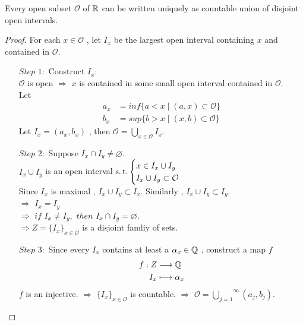 	\vspace*{2em}
	\begin{thm}\label{thm 1.1.3}
		Every open subset $\mathcal{O}$ of $\mathbb{R}$ can be written uniquely as countable union of disjoint open intervals.
		
		\begin{proof}
			For each $x \in \mathcal{O}$ , let $I_x$ be the largest open interval containing $x$ and contained in $\mathcal{O}$.
			\begin{enumerate}
				\item[$Step \,\, 1 :$]Construct $I_x$:\\
				$\mathcal{O}$ is open $\Rightarrow$ $x$ is contained in some small open interval contained in $\mathcal{O}$.\\
				Let 
				\begin{align}
					a_x &= inf\{ a < x \mid (a , x) \subset \mathcal{O} \} \\
					b_x &= sup\{ b > x \mid (x , b) \subset \mathcal{O} \}
				\end{align}
				Let $I_x = (a_x , b_x)$ , then $\mathcal{O} = \underset{x \in \mathcal{O}}{\bigcup}{I_x}$.
				
				\item[$Step \,\, 2 :$]Suppose $I_x \cap I_y \neq \varnothing$.\\
				$I_x \cup I_y$ is an open interval $\operatorname{s.t.} 
				\begin{cases}
					x \in I_x \cup I_y \\
					I_x \cup I_y \subset \mathcal{O}
				\end{cases}$\\
				Since $I_x$ is maximal , $I_x \cup I_y \subset I_x$. Similarly , $I_x \cup I_y \subset I_y$.\\
				$\Rightarrow \,\, I_x = I_y$ \\
				$\Rightarrow \,\, if \,\, I_x \neq I_y , \,\, then \,\, I_x \cap I_y = \varnothing.$\\
				$\Rightarrow Z = \{ I_x \}_{x \in \mathcal{O}}$ is a disjoint famliy of sets.
				
				\item[$Step \,\, 3 :$]Since every $I_x$ contains at least a $\alpha_x \in \mathbb{Q}$ , construct a map $f$
				\begin{align}
					f : Z &\longrightarrow \mathbb{Q} \\
					I_x &\longmapsto \alpha_x
				\end{align}
				$f$ is an injective. $\Rightarrow \,\, \{ I_x \}_{x \in \mathcal{O}}$ is countable. $\Rightarrow \,\, \mathcal{O} = \overset{\infty}{\underset{j = 1}{\bigcup}}{(a_j , b_j)}$.
			\end{enumerate}
		\end{proof}
	\end{thm}

